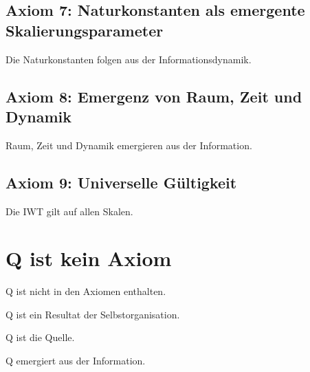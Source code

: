 \subsection{Axiom 7: Naturkonstanten als emergente Skalierungsparameter}

Die Naturkonstanten folgen aus der Informationsdynamik.

\subsection{Axiom 8: Emergenz von Raum, Zeit und Dynamik}

Raum, Zeit und Dynamik emergieren aus der Information.

\subsection{Axiom 9: Universelle Gültigkeit}

Die IWT gilt auf allen Skalen.

\section{Q ist kein Axiom}

Q ist nicht in den Axiomen enthalten.

Q ist ein Resultat der Selbstorganisation.

Q ist die Quelle.

Q emergiert aus der Information.